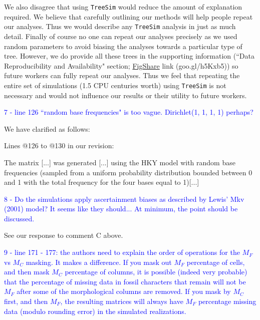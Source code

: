 \documentclass[11pt]{letter}
\begin{document}
\begin{letter}{}
We also disagree that using \texttt{TreeSim} would reduce the amount of explanation required. We believe that carefully outlining our methods will help people repeat our analyses. Thus we would describe any \texttt{TreeSim} analysis in just as much detail.
Finally of course no one can repeat our analyses precisely as we used random parameters to avoid biasing the analyses towards a particular type of tree. However, we do provide all these trees in the supporting information (``Data Reproducibility and Availability" section; \href{http://figshare.com/articles/Effect_of_missing_data_on_topological_inference_using_a_total_evidence_approach/1306861}{FigShare} link (goo.gl/h5Kxb5)) so future workers can fully repeat our analyses. Thus we feel that repeating the entire set of simulations (1.5 CPU centuries worth) using \texttt{TreeSim} is not necessary and would not influence our results or their utility to future workers.


\textcolor{blue}{7 - line 126 ``random base frequencies" is too vague. Dirichlet(1, 1, 1, 1) perhaps?}

We have clarified as follows:

Lines @126 to @130 in our revision:

\hfill\begin{minipage}{\dimexpr\textwidth-1cm}
The matrix [...] was generated [...] using the HKY model with random base frequencies (sampled from a uniform probability distribution bounded between 0 and 1 with the total frequency for the four bases equal to 1)[...]
\end{minipage}


\textcolor{blue}{8 - Do the simulations apply ascertainment biases as described by Lewis' Mkv (2001) model? It seems like they should... At minimum, the point should be discussed.}

See our response to comment C above.


\textcolor{blue}{9 - line 171 - 177: the authors need to explain the order of operations for the $M_F$ vs $M_C$ masking. It makes a difference. If you mask out $M_F$ percentage of cells, and then mask $M_C$ percentage of columns, it is possible (indeed very probable) that the percentage of missing data in fossil characters that remain will not be $M_F$ after some of the morphological columns are removed. If you mask by $M_C$ first, and then $M_F$, the resulting matrices will always have $M_F$ percentage missing data (modulo rounding error) in the simulated realizations.}


\end{letter}
\end{document}
